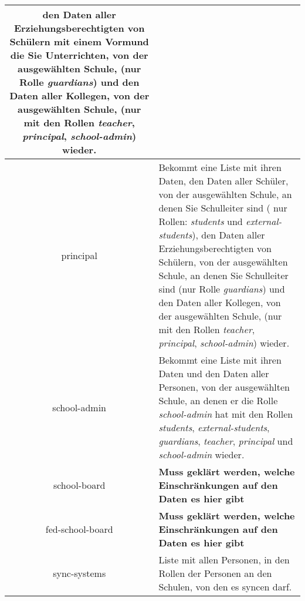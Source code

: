 \begin{longtable}{|c|p{}|}
					den Daten aller Erziehungsberechtigten von Schülern mit einem Vormund die Sie Unterrichten, von der ausgewählten Schule, (nur Rolle \textit{guardians}) und
					den Daten aller Kollegen, von der ausgewählten Schule, (nur mit den Rollen \textit{teacher}, \textit{principal}, \textit{school-admin}) 
					wieder.\\ \hline
principal & Bekommt eine Liste mit ihren Daten,
            den Daten aller Schüler, von der ausgewählten Schule, an denen Sie Schulleiter sind ( nur Rollen: \textit{students} und \textit{external-students}),
						den Daten aller Erziehungsberechtigten von Schülern, von der ausgewählten Schule, an denen Sie Schulleiter sind (nur Rolle \textit{guardians}) und
					  den Daten aller Kollegen, von der ausgewählten Schule, (nur mit den Rollen \textit{teacher}, \textit{principal}, \textit{school-admin})
						wieder.\\ \hline
school-admin & Bekommt eine Liste mit ihren Daten und
               den Daten aller Personen, von der ausgewählten Schule, an denen er die Rolle \textit{school-admin} hat mit den Rollen \textit{students}, \textit{external-students}, \textit{guardians}, \textit{teacher}, \textit{principal} und \textit{school-admin} wieder.  \\ \hline
school-board & \textcolor[rgb]{1,0.41,0.13}{\textbf{Muss geklärt werden, welche Einschränkungen auf den Daten es hier gibt}} \\ \hline
fed-school-board & \textcolor[rgb]{1,0.41,0.13}{\textbf{Muss geklärt werden, welche Einschränkungen auf den Daten es hier gibt}} \\ \hline
sync-systems & Liste mit allen Personen, in den Rollen der Personen an den Schulen, von den es syncen darf. \\ \hline
	\end{longtable}